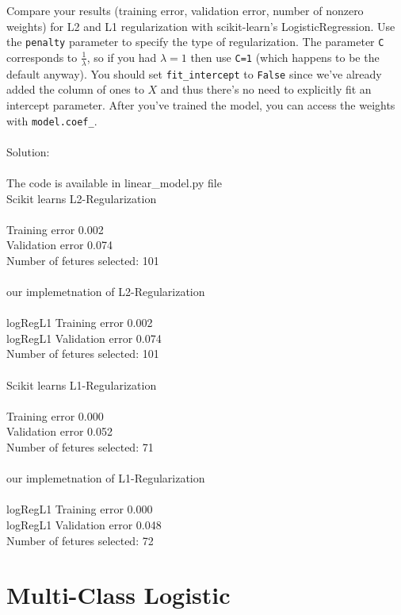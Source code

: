 \documentclass{article}
\def\blu#1{{\color{blu}#1}}
\begin{document}
Compare your results (training error, validation error, number of nonzero weights) for L2 and L1 regularization with scikit-learn's LogisticRegression. Use the
\texttt{penalty} parameter to specify the type of regularization. The parameter \texttt{C} corresponds to $\frac{1}{\lambda}$, so if
you had $\lambda=1$ then use \texttt{C=1} (which happens to be the default anyway).
You should set \texttt{fit\string_intercept} to \texttt{False} since we've already added the column of ones to $X$ and thus
there's no need to explicitly fit an intercept parameter. After you've trained the model, you can access the weights
with \texttt{model.coef\string_}. \\ \\
\blu{Solution: \\ \\
The code is available in linear\_model.py file  \\
Scikit learns L2-Regularization \\ \\
Training error 0.002 \\
Validation error 0.074 \\
Number of fetures selected: 101 \\ \\
our implemetnation of L2-Regularization \\ \\
logRegL1 Training error 0.002 \\
logRegL1 Validation error 0.074 \\
Number of fetures selected: 101 \\ \\
Scikit learns L1-Regularization \\ \\ 
Training error 0.000 \\
Validation error 0.052 \\
Number of fetures selected: 71 \\ \\
 our implemetnation of L1-Regularization \\ \\
logRegL1 Training error 0.000 \\
logRegL1 Validation error 0.048 \\
Number of fetures selected: 72 \\
}

\section{Multi-Class Logistic}
\end{document}

